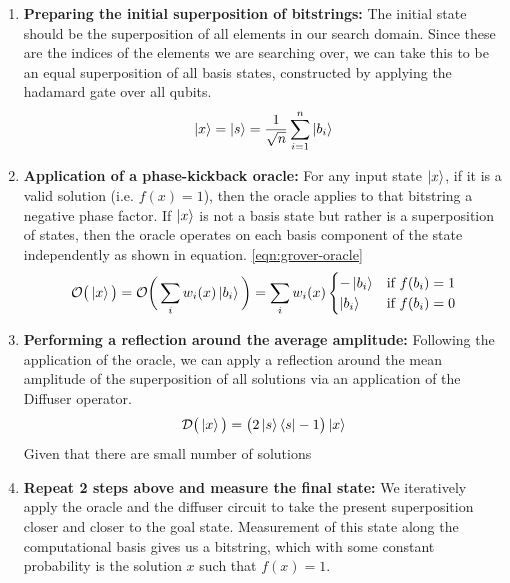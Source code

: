 \begin{enumerate}
    \item \textbf{Preparing the initial superposition of bitstrings:} The initial state should be the superposition of all elements in our search domain. Since these are the indices of the elements we are searching over, we can take this to be an equal superposition of all basis states, constructed by applying the hadamard gate over all qubits.
    \begin{equation}
        \ket{x} = \ket{s} = \frac{1}{\sqrt{n}} \sum_{i=1}^{n} \ket{b_i}
    \end{equation}

    \item \textbf{Application of a phase-kickback oracle:} For any input state $\ket{x}$, if it is a valid solution (i.e. $f(x) = 1$), then the oracle applies to that bitstring a negative phase factor. If $\ket{x}$ is not a basis state but rather is a superposition of states, then the oracle operates on each basis component of the state independently as shown in equation. \ref{eqn:grover-oracle}
    \begin{equation}\label{eqn:grover-oracle}
        \mathcal{O} \big(\ket{x} \big) = \mathcal{O}\bigg(\sum_i w_i(x) \ket{b_i} \bigg) = \sum_i w_i(x) \begin{cases}
            -\ket{b_i} & \text{if } f(b_i) = 1 \\
            \ket{b_i} & \text{if } f(b_i) = 0
        \end{cases}
    \end{equation}
    
    \item \textbf{Performing a reflection around the average amplitude:} Following the application of the oracle, we can apply a reflection around the mean amplitude of the superposition of all solutions via an application of the Diffuser operator.
    \begin{equation}
        \mathcal{D} \big(\ket{x} \big) = \big( 2 \ket{s}\bra{s} - 1 \big) \ket{x}
    \end{equation}
    Given that there are small number of solutions 
    \item \textbf{Repeat 2 steps above and measure the final state:} We iteratively apply the oracle and the diffuser circuit to take the present superposition closer and closer to the goal state. Measurement of this state along the computational basis gives us a bitstring, which with some constant probability is the solution $x$ such that $f(x) = 1$.
\end{enumerate}

